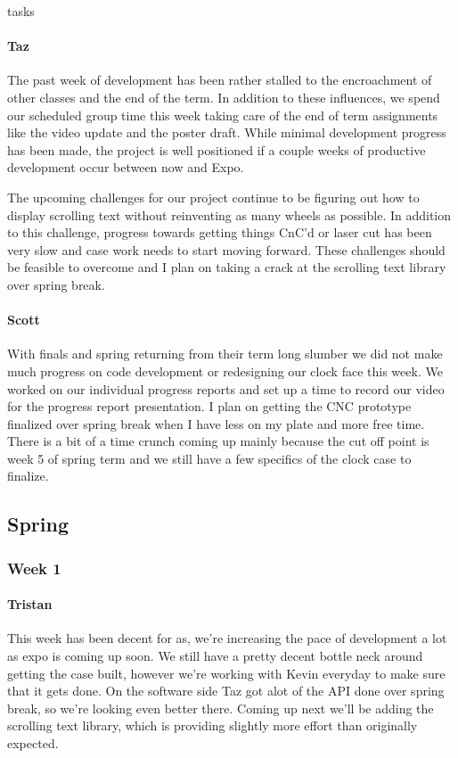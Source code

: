 tasks\documentclass[onecolumn, draftclsnofoot,10pt, compsoc]{IEEEtran}
\begin{document}
\paragraph{Taz}
The past week of development has been rather stalled to the encroachment of other classes and the end of the term. In addition to these influences, we spend our scheduled group time this week taking care of the end of term assignments like the video update and the poster draft. While minimal development progress has been made, the project is well positioned if a couple weeks of productive development occur between now and Expo.

The upcoming challenges for our project continue to be figuring out how to display scrolling text without reinventing as many wheels as possible. In addition to this challenge, progress towards getting things CnC'd or laser cut has been very slow and case work needs to start moving forward. These challenges should be feasible to overcome and I plan on taking a crack at the scrolling text library over spring break.
\paragraph{Scott}
With finals and spring returning from their term long slumber we did not make much progress on code development or redesigning our clock face this week. We worked on our individual progress reports and set up a time to record our video for the progress report presentation. I plan on getting the CNC prototype finalized over spring break when I have less on my plate and more free time. There is a bit of a time crunch coming up mainly because the cut off point is week 5 of spring term and we still have a few specifics of the clock case to finalize.
\subsection{Spring}
\subsubsection{Week 1}
\paragraph{Tristan}
This week has been decent for as, we're increasing the pace of development a lot as expo is coming up soon. We still have a pretty decent bottle neck around getting the case built, however we're working with Kevin everyday to make sure that it gets done. On the software side Taz got alot of the API done over spring break, so we're looking even better there. Coming up next we'll be adding the scrolling text library, which is providing slightly more effort than originally expected.
\end{document}
